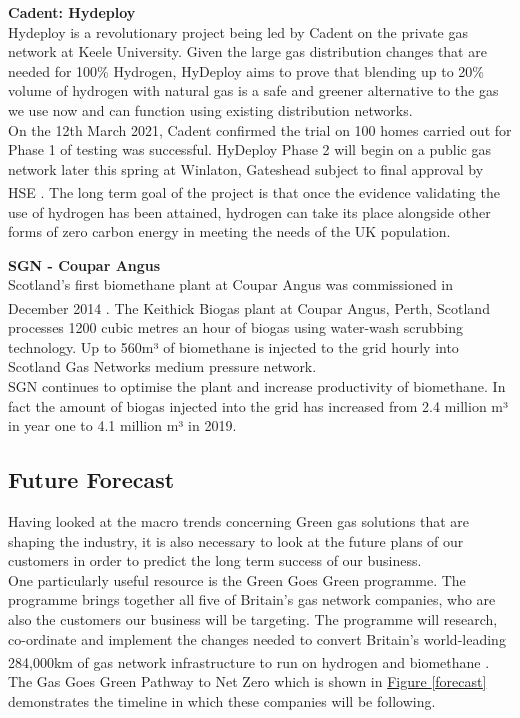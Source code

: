 \documentclass[11pt]{article}		%
\newcommand{\supercite}[1]{\textsuperscript{\cite{#1}}}		%
\newcommand{\figref}[1]{\hyperref[#1]{Figure \ref*{#1}}}    %
\begin{document}
    		\textbf{Cadent: Hydeploy}\\
            Hydeploy is a revolutionary project being led by Cadent on the private gas network at Keele University. Given the large gas distribution changes that are needed for 100\% Hydrogen, HyDeploy aims to prove that blending up to 20\% volume of hydrogen with natural gas is a safe and greener alternative to the gas we use now and can function using existing distribution networks.\\
            \hspace*{3ex}On the 12th March 2021, Cadent confirmed the trial on 100 homes carried out for Phase 1 of testing was successful. HyDeploy Phase 2 will begin on a public gas network later this spring at Winlaton, Gateshead subject to final approval by HSE \supercite{hydeploy}. The long term goal of the project is that once the evidence validating the use of hydrogen has been attained, hydrogen can take its place alongside other forms of zero carbon energy in meeting the needs of the UK population.
    
    		\textbf{SGN - Coupar Angus}\\
    
            Scotland’s first biomethane plant at Coupar Angus was commissioned in December 2014 \supercite{coupar}. The Keithick Biogas plant at Coupar Angus, Perth, Scotland processes 1200 cubic metres an hour of biogas using water-wash scrubbing technology. Up to 560m³ of biomethane is injected to the grid hourly into Scotland Gas Networks medium pressure network.\\
    	    \hspace*{3ex}SGN continues to optimise the plant and increase productivity of biomethane. In fact the amount of biogas injected into the grid has increased from 2.4 million m³ in year one to 4.1 million m³ in 2019.
    
    		\subsection[Future Forecast]{Future Forecast}
    		
    		Having looked at the macro trends concerning Green gas solutions that are shaping the industry, it is also necessary to look at the future plans of our customers in order to predict the long term success of our business. \\
        	\hspace*{3ex}One particularly useful resource is the Green Goes Green programme. The programme brings together all five of Britain’s gas network companies, who are also the customers our business will be targeting. The programme will research, co-ordinate and implement the changes needed to convert Britain’s world-leading 284,000km of gas network infrastructure to run on hydrogen and biomethane \supercite{gasgoesgreen}. The Gas Goes Green Pathway to Net Zero which is shown in \figref{forecast} demonstrates the timeline in which these companies will be following.
    
\end{document}
